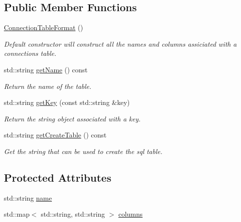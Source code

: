 \subsection*{\-Public \-Member \-Functions}
\begin{DoxyCompactItemize}
\item 
\hyperlink{structcryomesh_1_1manager_1_1ConnectionTableFormat_a3aa9a5ff9e56afbb489fcfbed4dda041}{\-Connection\-Table\-Format} ()
\begin{DoxyCompactList}\small\item\em \-Default constructor will construct all the names and columns assiciated with a connections table. \end{DoxyCompactList}\item 
std\-::string \hyperlink{structcryomesh_1_1manager_1_1TableFormat_a3e797d6130c6b0745a1fac799c25677a}{get\-Name} () const 
\begin{DoxyCompactList}\small\item\em \-Return the name of the table. \end{DoxyCompactList}\item 
std\-::string \hyperlink{structcryomesh_1_1manager_1_1TableFormat_a2256ce39471582b92bf7cbb6eec74d30}{get\-Key} (const std\-::string \&key)
\begin{DoxyCompactList}\small\item\em \-Return the string object associated with a key. \end{DoxyCompactList}\item 
std\-::string \hyperlink{structcryomesh_1_1manager_1_1TableFormat_a898ae0d0c5490ccdf71aec5156b10fcc}{get\-Create\-Table} () const 
\begin{DoxyCompactList}\small\item\em \-Get the string that can be used to create the sql table. \end{DoxyCompactList}\end{DoxyCompactItemize}
\subsection*{\-Protected \-Attributes}
\begin{DoxyCompactItemize}
\item 
std\-::string \hyperlink{structcryomesh_1_1manager_1_1TableFormat_ab49912897ccb7fd0f8d42f1cc21332e8}{name}
\item 
std\-::map$<$ std\-::string, \*
std\-::string $>$ \hyperlink{structcryomesh_1_1manager_1_1TableFormat_a29ab6f4cfc0c56da1fa461ea665a1b61}{columns}
\end{DoxyCompactItemize}


